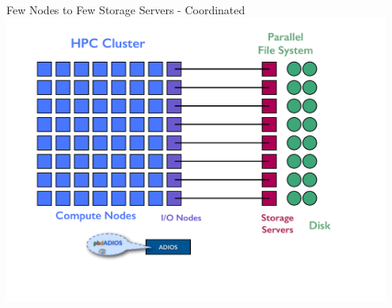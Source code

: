 \begin{frame}
  \begin{block}{Few Nodes to Few Storage Servers - Coordinated}
    \includegraphics[width=0.95\textwidth]{../common/pics/hardware/ParallelHardware20.pdf}
  \end{block}
\end{frame}

